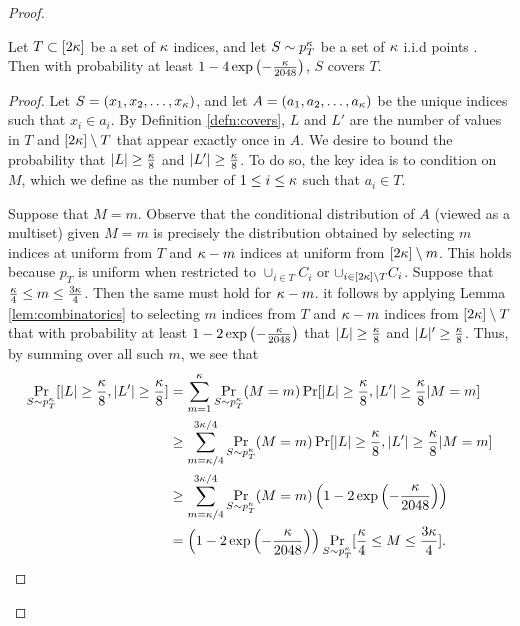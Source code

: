 \begin{proof}
\begin{lemma}\label{lem:with_high_probability}
Let $T \subset [2\kappa]$ be a set of $\kappa$ indices, and let $S \sim p_T^\kappa$ be a set of $\kappa$ i.i.d points . Then with probability at least $1 - 4\exp\left(-\frac{\kappa}{2048}\right)$, $S$ covers $T$.
\end{lemma}

\begin{proof}
Let $S = (x_1, x_2, \dots, x_\kappa)$, and let $A = (a_1, a_2, \dots, a_\kappa)$ be the unique indices such that $x_i \in a_i$. By Definition \ref{defn:covers}, $L$ and $L'$ are the number of values in $T$ and $[2\kappa] \setminus T$ that appear exactly once in $A$. We desire to bound the probability that $|L| \geq \frac{\kappa}{8}$ and $|L'| \geq \frac{\kappa}{8}$. To do so, the key idea is to condition on $M$, which we define as the number of $1 \leq i \leq \kappa$ such that $a_i \in T$. 

Suppose that $M = m$. Observe that the conditional distribution of $A$ (viewed as a multiset) given $M = m$ is precisely the distribution obtained by selecting $m$ indices at uniform from $T$ and $\kappa-m$ indices at uniform from $[2\kappa] \setminus m$. This holds because $p_T$ is uniform when restricted to $\cup_{i \in T} C_i$ or $\cup_{i \in [2\kappa] \setminus T} C_i$. Suppose that $\frac{\kappa}{4} \leq m \leq \frac{3\kappa}{4}$. Then the same must hold for $\kappa - m$. it follows by applying Lemma \ref{lem:combinatorics} to selecting $m$ indices from $T$ and $\kappa-m$ indices from $[2\kappa]\setminus T$ that with probability  at least $1 - 2\exp\left(-\frac{\kappa}{2048}\right)$ that $|L| \geq \frac{\kappa}{8}$ and $|L|' \geq \frac{\kappa}{8}$. Thus, by summing over all such $m$, we see that 
\begin{equation*}
\begin{split}
\Pr_{S \sim p_T^\kappa}[|L| \geq \frac{\kappa}{8}, |L'| \geq \frac{\kappa}{8}] &= \sum_{m = 1}^\kappa \Pr_{S \sim p_T^\kappa}(M = m) \Pr[|L| \geq \frac{\kappa}{8}, |L'| \geq \frac{\kappa}{8} | M = m] \\
&\geq \sum_{m = \kappa/4}^{3\kappa/4}  \Pr_{S \sim p_T^\kappa}(M = m)\Pr[|L| \geq \frac{\kappa}{8}, |L'| \geq \frac{\kappa}{8} | M = m] \\
&\geq \sum_{m = \kappa/4}^{3\kappa/4}\Pr_{S \sim p_T^\kappa}(M = m)\left(1 - 2\exp\left(-\frac{\kappa}{2048}\right)\right) \\
&= \left(1 - 2\exp\left(-\frac{\kappa}{2048}\right)\right) \Pr_{S \sim p_T^\kappa}[\frac{\kappa}{4} \leq M \leq \frac{3\kappa}{4}].
\end{split}
\end{equation*}


\end{proof}
\end{proof}
